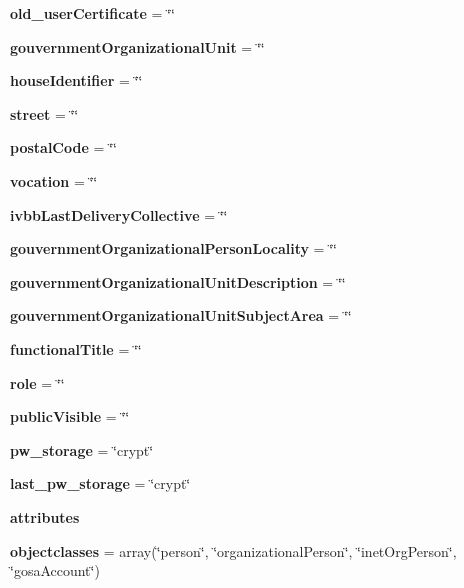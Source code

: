 \begin{CompactItemize}
\item 
{\bf old\_\-user\-Certificate} = \char`\"{}\char`\"{}\label{classuser_o33}

\item 
{\bf gouvernment\-Organizational\-Unit} = \char`\"{}\char`\"{}\label{classuser_o34}

\item 
{\bf house\-Identifier} = \char`\"{}\char`\"{}\label{classuser_o35}

\item 
{\bf street} = \char`\"{}\char`\"{}\label{classuser_o36}

\item 
{\bf postal\-Code} = \char`\"{}\char`\"{}\label{classuser_o37}

\item 
{\bf vocation} = \char`\"{}\char`\"{}\label{classuser_o38}

\item 
{\bf ivbb\-Last\-Delivery\-Collective} = \char`\"{}\char`\"{}\label{classuser_o39}

\item 
{\bf gouvernment\-Organizational\-Person\-Locality} = \char`\"{}\char`\"{}\label{classuser_o40}

\item 
{\bf gouvernment\-Organizational\-Unit\-Description} = \char`\"{}\char`\"{}\label{classuser_o41}

\item 
{\bf gouvernment\-Organizational\-Unit\-Subject\-Area} = \char`\"{}\char`\"{}\label{classuser_o42}

\item 
{\bf functional\-Title} = \char`\"{}\char`\"{}\label{classuser_o43}

\item 
{\bf role} = \char`\"{}\char`\"{}\label{classuser_o44}

\item 
{\bf public\-Visible} = \char`\"{}\char`\"{}\label{classuser_o45}

\item 
{\bf pw\_\-storage} = \char`\"{}crypt\char`\"{}\label{classuser_o46}

\item 
{\bf last\_\-pw\_\-storage} = \char`\"{}crypt\char`\"{}\label{classuser_o47}

\item 
{\bf attributes}
\item 
{\bf objectclasses} = array(\char`\"{}person\char`\"{}, \char`\"{}organizational\-Person\char`\"{}, \char`\"{}inet\-Org\-Person\char`\"{}, \char`\"{}gosa\-Account\char`\"{})\label{classuser_o49}

\end{CompactItemize}


